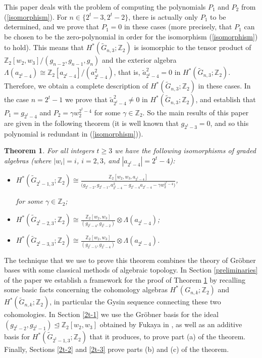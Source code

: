 \documentclass{amsart}
\newtheorem{theorem}{Theorem}[section]
\theoremstyle{definition}
\theoremstyle{remark}
\numberwithin{equation}{section}
\begin{document}
This paper deals with the problem of computing the polynomials $P_1$ and $P_2$ from (\ref{isomorphism}). For $n\in\{2^t-3,2^t-2\}$, there is actually only $P_1$ to be determined, and we prove that $P_1=0$ in these cases (more precisely, that $P_1$ can be chosen to be the zero-polynomial in order for the isomorphism (\ref{isomorphism}) to hold). This means that $H^*(\widetilde G_{n,3};\mathbb Z_2)$ is isomorphic to the tensor product of $\mathbb Z_2[w_2,w_3]/(g_{n-2},g_{n-1},g_n)$ and the exterior algebra $\Lambda(a_{2^t-4})\cong\mathbb Z_2[a_{2^t-4}]/(a_{2^t-4}^2)$, that is, $\widetilde a_{2^t-4}^2=0$ in $H^*(\widetilde G_{n,3};\mathbb Z_2)$. Therefore, we obtain a complete description of $H^*(\widetilde G_{n,3};\mathbb Z_2)$ in these cases. In the case $n=2^t-1$ we prove that $\widetilde a_{2^t-4}^2\neq0$ in $H^*(\widetilde G_{n,3};\mathbb Z_2)$, and establish that $P_1=g_{2^t-4}$ and $P_2=\gamma w_2^{2^t-4}$ for some $\gamma\in\mathbb Z_2$. So the main results of this paper are given in the following theorem (it is well known that $g_{2^t-3}=0$, and so this polynomial is redundant in (\ref{isomorphism})).

\begin{theorem}\label{mainthm}
For all integers $t\ge3$ we have the following isomorphisms of graded algebras (where $|w_i|=i$, $i=2,3$, and $|a_{2^t-4}|=2^t-4$):
\begin{itemize}
\item[(a)] $\displaystyle H^*(\widetilde G_{2^t-1,3};\mathbb Z_2)\cong\frac{\mathbb Z_2[w_2,w_3,a_{2^t-4}]}{\big(g_{2^t-2},g_{2^t-1},a_{2^t-4}^2-g_{2^t-4}a_{2^t-4}-\gamma w_2^{2^t-4}\big)}$,

    \noindent for some $\gamma\in\mathbb Z_2$;
\item[(b)] $\displaystyle H^*(\widetilde G_{2^t-2,3};\mathbb Z_2)\cong\frac{\mathbb Z_2[w_2,w_3]}{(g_{2^t-4},g_{2^t-2})}\otimes\Lambda(a_{2^t-4})$;
\item[(c)] $\displaystyle H^*(\widetilde G_{2^t-3,3};\mathbb Z_2)\cong\frac{\mathbb Z_2[w_2,w_3]}{(g_{2^t-5},g_{2^t-4})}\otimes\Lambda(a_{2^t-4})$.
\end{itemize}
\end{theorem}

The technique that we use to prove this theorem combines the theory of Gr\"obner bases with some classical methods of algebraic topology. In Section \ref{preliminaries} of the paper we establish a framework for the proof of Theorem \ref{mainthm} by recalling some basic facts concerning the cohomology algebras $H^*(G_{n,k};\mathbb Z_2)$ and $H^*(\widetilde G_{n,k};\mathbb Z_2)$, in particular the Gysin sequence connecting these two cohomologies. In Section \ref{2t-1} we use the Gr\"obner basis for the ideal $(g_{2^t-2},g_{2^t-1})\trianglelefteq\mathbb Z_2[w_2,w_3]$ obtained by Fukaya in \cite{Fukaya}, as well as an additive basis for $H^*(\widetilde G_{2^t-1,3};\mathbb Z_2)$ that it produces, to prove part (a) of the theorem. Finally, Sections \ref{2t-2} and \ref{2t-3} prove parts (b) and (c) of the theorem.
\end{document}
